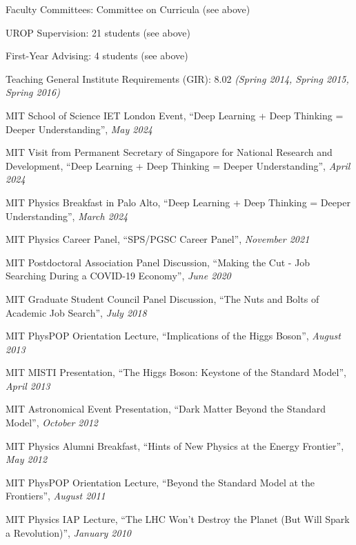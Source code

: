 \item Faculty Committees: Committee on Curricula (see above) 
\item UROP Supervision: 21 students (see above) 
\item First-Year Advising: 4 students (see above) 
\item Teaching General Institute Requirements (GIR):  8.02 \emph{(Spring 2014, Spring 2015, Spring 2016)}
\item MIT School of Science IET London Event, ``Deep Learning + Deep Thinking = Deeper Understanding'', \emph{May 2024}
\item MIT Visit from Permanent Secretary of Singapore for National Research and Development, ``Deep Learning + Deep Thinking = Deeper Understanding'', \emph{April 2024}
\item MIT Physics Breakfast in Palo Alto, ``Deep Learning + Deep Thinking = Deeper Understanding'', \emph{March 2024}
\item MIT Physics Career Panel, ``SPS/PGSC Career Panel'', \emph{November 2021}
\item MIT Postdoctoral Association Panel Discussion, ``Making the Cut - Job Searching During a COVID-19 Economy'', \emph{June 2020}
\item MIT Graduate Student Council Panel Discussion, ``The Nuts and Bolts of Academic Job Search'', \emph{July 2018}
\item MIT PhysPOP Orientation Lecture, ``Implications of the Higgs Boson'', \emph{August 2013}
\item MIT MISTI Presentation, ``The Higgs Boson: Keystone of the Standard Model'', \emph{April 2013}
\item MIT Astronomical Event Presentation, ``Dark Matter Beyond the Standard Model'', \emph{October 2012}
\item MIT Physics Alumni Breakfast, ``Hints of New Physics at the Energy Frontier'', \emph{May 2012}
\item MIT PhysPOP Orientation Lecture, ``Beyond the Standard Model at the Frontiers'', \emph{August 2011}
\item MIT Physics IAP Lecture, ``The LHC Won’t Destroy the Planet (But Will Spark a Revolution)'', \emph{January 2010}
